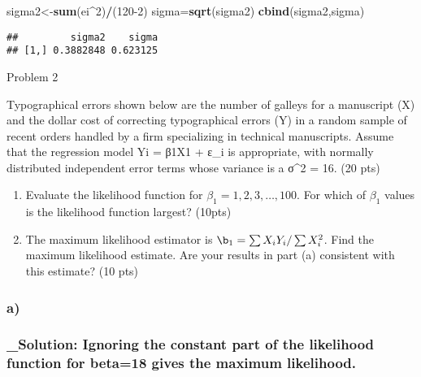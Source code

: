 \documentclass[
]{article}
\newenvironment{Shaded}{\begin{snugshade}}{\end{snugshade}}
\newcommand{\DecValTok}[1]{\textcolor[rgb]{0.00,0.00,0.81}{#1}}
\newcommand{\KeywordTok}[1]{\textcolor[rgb]{0.13,0.29,0.53}{\textbf{#1}}}
\newcommand{\NormalTok}[1]{#1}
\newcommand{\OperatorTok}[1]{\textcolor[rgb]{0.81,0.36,0.00}{\textbf{#1}}}
\begin{document}
\begin{Shaded}
\begin{Highlighting}[]
\NormalTok{sigma2<-}\KeywordTok{sum}\NormalTok{(ei}\OperatorTok{^}\DecValTok{2}\NormalTok{)}\OperatorTok{/}\NormalTok{(}\DecValTok{120-2}\NormalTok{)}
\NormalTok{sigma=}\KeywordTok{sqrt}\NormalTok{(sigma2)}
\KeywordTok{cbind}\NormalTok{(sigma2,sigma)}
\end{Highlighting}
\end{Shaded}

\begin{verbatim}
##         sigma2    sigma
## [1,] 0.3882848 0.623125
\end{verbatim}

Problem 2

Typographical errors shown below are the number of galleys for a
manuscript (X) and the dollar cost of correcting typographical errors
(Y) in a random sample of recent orders handled by a firm specializing
in technical manuscripts. Assume that the regression model Yi = β1X1 +
ε\_i is appropriate, with normally distributed independent error terms
whose variance is a σ\^{}2 = 16. (20 pts)

\begin{enumerate}
\def\labelenumi{\alph{enumi})}
\item
  Evaluate the likelihood function for \(\beta_{1}= 1,2, 3,…,100\). For
  which of \(\beta_{1}\) values is the likelihood function largest?
  (10pts)
\item
  The maximum likelihood estimator is
  \(\b_{1}=\sum X_{i} Y_{i}/\sum X_{i}^2\). Find the maximum likelihood
  estimate. Are your results in part (a) consistent with this estimate?
  (10 pts)
\end{enumerate}

\hypertarget{a-1}{%
\subsubsection{a)}\label{a-1}}

\hypertarget{solution-ignoring-the-constant-part-of-the-likelihood-function-for-beta18-gives-the-maximum-likelihood.}{%
\subsubsection{\_Solution: Ignoring the constant part of the likelihood
function for beta=18 gives the maximum
likelihood.}\label{solution-ignoring-the-constant-part-of-the-likelihood-function-for-beta18-gives-the-maximum-likelihood.}}
\end{document}
